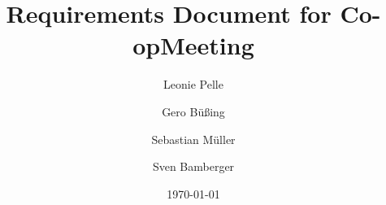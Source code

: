 \documentclass{book}
\title{Requirements Document for Co-opMeeting}
\author{Leonie Pelle \and Gero B\"u{\ss}ing \and Sebastian M\"uller \and Sven Bamberger}
\date{\today}
\begin{document}

\maketitle


\printglossaries

\tableofcontents




\end{document}
